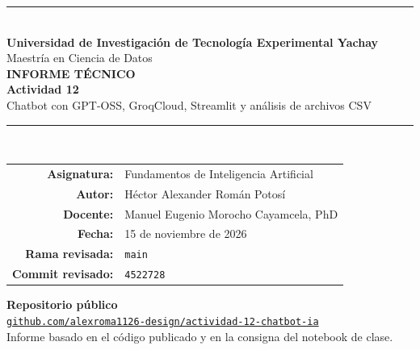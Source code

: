 \documentclass[11pt,a4paper]{article}
\begin{document}

\begin{titlepage}
\thispagestyle{empty}
\begin{center}

\vspace*{1cm}

{\color{azul}\rule{\textwidth}{1.2pt}}\\[0.8cm]

{\Large\bfseries
Universidad de Investigación de Tecnología Experimental Yachay
}\\[0.35cm]

{\large Maestría en Ciencia de Datos}\\[1.5cm]

{\color{azul}\LARGE\bfseries INFORME TÉCNICO}\\[0.45cm]

{\Huge\bfseries Actividad 12}\\[0.45cm]

{\Large
Chatbot con GPT-OSS, GroqCloud, Streamlit
y análisis de archivos CSV
}\\[0.8cm]

{\color{azul}\rule{0.78\textwidth}{0.8pt}}\\[1.5cm]

\begin{tabular}{@{}rl@{}}
\textbf{Asignatura:} & Fundamentos de Inteligencia Artificial\\
\textbf{Autor:} & Héctor Alexander Román Potosí\\
\textbf{Docente:} & Manuel Eugenio Morocho Cayamcela, PhD\\
\textbf{Fecha:} & 15 de noviembre de 2026\\
\textbf{Rama revisada:} & \texttt{main}\\
\textbf{Commit revisado:} & \texttt{4522728}\\
\end{tabular}

\vfill

\textbf{Repositorio público}\\[3mm]

\href{
https://github.com/alexroma1126-design/actividad-12-chatbot-ia
}{
\texttt{github.com/alexroma1126-design/actividad-12-chatbot-ia}
}\\[0.8cm]

{\small\color{gris}
Informe basado en el código publicado y
en la consigna del notebook de clase.
}

\end{center}
\end{titlepage}
\end{document}
